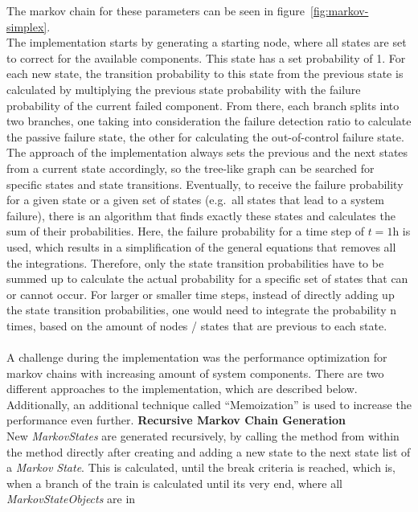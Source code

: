 The markov chain for these parameters can be seen in figure~\ref{fig:markov-simplex}.
\\
The implementation starts by generating a starting node, where all states are set to correct for the available components.
This state has a set probability of 1.
For each new state, the transition probability to this state from the previous state is calculated by multiplying the previous state probability with the
failure probability of the current failed component.
From there, each branch splits into two branches, one taking into consideration the failure detection ratio to calculate the passive failure state,
the other for calculating the out-of-control failure state.
\\
The approach of the implementation always sets the previous and the next states from a current state accordingly, so the tree-like
graph can be searched for specific states and state transitions.
Eventually, to receive the failure probability for a given state or a given set of states (e.g.\ all states that lead to a system failure), there is an algorithm
that finds exactly these states and calculates the sum of their probabilities.
Here, the failure probability for a time step of $t = 1 \text{h}$ is used, which results in a simplification of the general equations that removes all the integrations.
Therefore, only the state transition probabilities have to be summed up to calculate the actual probability for a specific set of states that can or cannot occur.
For larger or smaller time steps, instead of directly adding up the state transition probabilities, one would need to integrate the probability n times, based on the amount of nodes
/ states that are previous to each state.
\\
\\
A challenge during the implementation was the performance optimization for markov chains with increasing amount of system components.
There are two different approaches to the implementation, which are described below.
Additionally, an additional technique called ``Memoization'' is used to increase the performance even further.
\textbf{Recursive Markov Chain Generation}\\
New \textit{MarkovStates} are generated recursively, by calling the method from within the method directly after creating
and adding a new state to the next state list of a \textit{Markov State}.
This is calculated, until the break criteria is reached, which is, when a branch of the train is calculated until its very end,
where all \textit{MarkovStateObjects} are in
